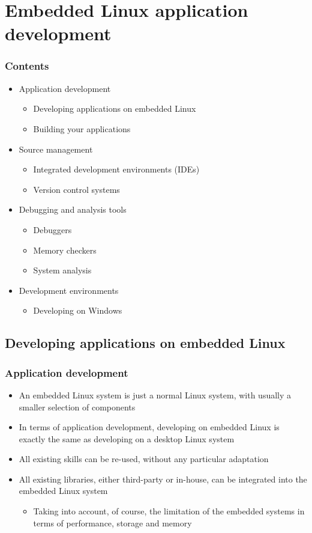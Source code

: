 \section{Embedded Linux application development}

\begin{frame}
  \frametitle{Contents}
  \begin{itemize}
  \item Application development
    \begin{itemize}
    \item Developing applications on embedded Linux
    \item Building your applications
    \end{itemize}
  \item Source management
    \begin{itemize}
    \item Integrated development environments (IDEs)
    \item Version control systems
    \end{itemize}
  \item Debugging and analysis tools
    \begin{itemize}
    \item Debuggers
    \item Memory checkers
    \item System analysis
    \end{itemize}
  \item Development environments
    \begin{itemize}
    \item Developing on Windows
    \end{itemize}
  \end{itemize}
\end{frame}

\subsection{Developing applications on embedded Linux}

\begin{frame}
  \frametitle{Application development}
  \begin{itemize}
  \item An embedded Linux system is just a normal Linux system, with
    usually a smaller selection of components
  \item In terms of application development, developing on embedded
    Linux is exactly the same as developing on a desktop Linux system
  \item All existing skills can be re-used, without any particular
    adaptation
  \item All existing libraries, either third-party or in-house, can be
    integrated into the embedded Linux system
    \begin{itemize}
    \item Taking into account, of course, the limitation of the
      embedded systems in terms of performance, storage and memory
    \end{itemize}
  \end{itemize}
\end{frame}

